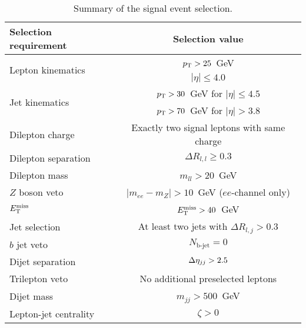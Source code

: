 \begin{table}[htb]
  \centering
  \begin{tabular}{l|c}
    Selection requirement              & Selection value \\
    \hline\hline
    \multirow{2}{*}{Lepton kinematics} & $p_{\mathrm{T}} > 25$~GeV \\
                                       & $|\eta| \le 4.0$ \\
    \multirow{2}{*}{Jet kinematics}    & $p_{\mathrm{T}} > 30$~GeV for $|\eta| \le 4.5$ \\
                                       & $p_{\mathrm{T}} > 70$~GeV for $|\eta| > 3.8$ \\
    \hline
    Dilepton charge                    & Exactly two signal leptons with same charge\\
    Dilepton separation                & $\Delta R_{l,l} \ge 0.3$ \\
    Dilepton mass                      & $m_{ll} > 20$~GeV\\
    $Z$ boson veto                     & $|m_{ee} - m_Z| > 10$~GeV ($ee$-channel only) \\
    $E_{\mathrm{T}}^{\mathrm{miss}}$                             & $E_{\mathrm{T}}^{\mathrm{miss}} > 40$~GeV \\
    Jet selection                      & At least two jets with $\Delta R_{l,j} > 0.3$\\
    $b$ jet veto                       & $N_{\textrm{b-jet}} = 0$\\
    Dijet separation                   & $\detajj > 2.5$\\
    Trilepton veto                     & No additional preselected leptons\\
    Dijet mass                         & $m_{jj} > 500$~GeV\\
    Lepton-jet centrality              & $\zeta > 0$\\
    \hline
  \end{tabular}
  \caption{Summary of the signal event selection.}
  \label{tab:sswwupgrade_event_selection}
\end{table}
